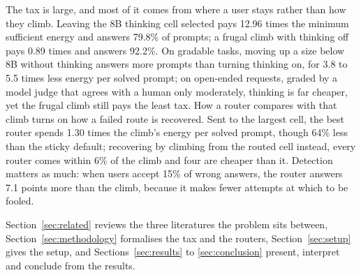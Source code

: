 The tax is large, and most of it comes from where a user stays rather than
how they climb. Leaving the 8B thinking cell selected pays 12.96 times the
minimum sufficient energy and answers 79.8\% of prompts; a frugal climb with
thinking off pays 0.89 times and answers 92.2\%. On gradable tasks, moving up
a size below 8B without thinking answers more prompts than turning thinking
on, for 3.8 to 5.5 times less energy per solved prompt; on open-ended
requests, graded by a model judge that agrees with a human only moderately,
thinking is far cheaper, yet the frugal climb still pays the least tax. How a
router compares with that climb turns on how a failed route is recovered.
Sent to the largest cell, the best router spends 1.30 times the climb's
energy per solved prompt, though 64\% less than the sticky default;
recovering by climbing from the routed cell instead, every router comes
within 6\% of the climb and four are cheaper than it. Detection matters as
much: when users accept 15\% of wrong answers, the router answers 7.1 points
more than the climb, because it makes fewer attempts at which to be fooled.

Section~\ref{sec:related} reviews the three literatures the problem sits
between, Section~\ref{sec:methodology} formalises the tax and the routers,
Section~\ref{sec:setup} gives the setup, and
Sections~\ref{sec:results} to \ref{sec:conclusion} present, interpret and
conclude from the results.
